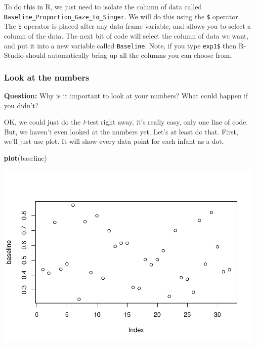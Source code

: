 \documentclass[
]{book}
\newenvironment{Shaded}{\begin{snugshade}}{\end{snugshade}}
\newcommand{\FunctionTok}[1]{\textcolor[rgb]{0.13,0.29,0.53}{\textbf{#1}}}
\newcommand{\NormalTok}[1]{#1}
\newcommand{\OtherTok}[1]{\textcolor[rgb]{0.56,0.35,0.01}{#1}}
\newcommand{\SpecialCharTok}[1]{\textcolor[rgb]{0.81,0.36,0.00}{\textbf{#1}}}
\begin{document}
To do this in R, we just need to isolate the column of data called \texttt{Baseline\_Proportion\_Gaze\_to\_Singer}. We will do this using the \texttt{\$} operator. The \texttt{\$} operator is placed after any data frame variable, and allows you to select a column of the data. The next bit of code will select the column of data we want, and put it into a new variable called \texttt{Baseline}. Note, if you type \texttt{exp1\$} then R-Studio should automatically bring up all the columns you can choose from.

\begin{Shaded}
\end{Shaded}

\hypertarget{look-at-the-numbers}{%
\subsubsection{Look at the numbers}\label{look-at-the-numbers}}

\textbf{Question:} Why is it important to look at your numbers? What could happen if you didn't?

OK, we could just do the \emph{t}-test right away, it's really easy, only one line of code. But, we haven't even looked at the numbers yet. Let's at least do that. First, we'll just use plot. It will show every data point for each infant as a dot.

\begin{Shaded}
\begin{Highlighting}[]
\FunctionTok{plot}\NormalTok{(baseline)}
\end{Highlighting}
\end{Shaded}

\includegraphics{Statistics_Lab_files/figure-latex/unnamed-chunk-166-1.pdf}
\end{document}
